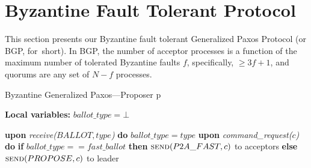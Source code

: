 \documentclass[algorithms,article,accept,moreauthors,pdftex,10pt,a4paper]{Definitions/mdpi}
\begin{document}
%

\section{Byzantine Fault Tolerant Protocol}
\label{sec:bft}
%
This section presents our Byzantine fault tolerant Generalized Paxos
Protocol (or BGP, for~short). 
In BGP, the number of acceptor processes is a function of the maximum number of tolerated Byzantine faults $f$, specifically, $\geq 3f+1$, and quorums are any set of $N-f$ processes.

\begin{algorithm}[H]
\caption{Byzantine Generalized Paxos---Proposer p}
\label{BFT-Prop}
\textbf{Local variables:} $ballot\_type = \bot$
\begin{algorithmic}[1] 
\State \textbf{upon} \textit{receive($BALLOT, type$)} \textbf{do} 
\State \hspace{\algorithmicindent} $ballot\_type = type$
\State
\State \textbf{upon} \textit{command\_request($c$)} \textbf{do} \hspace{\algorithmicindent}\hspace{\algorithmicindent}\hspace{\algorithmicindent}\hspace{\algorithmicindent}
\State \hspace{\algorithmicindent} \textbf{if} $ballot\_type == fast\_ballot$ \textbf{then}
\State \hspace{\algorithmicindent}\hspace{\algorithmicindent} $\Call{send}{P2A\_FAST, c}$ to acceptors
\State \hspace{\algorithmicindent} \textbf{else} 
\State \hspace{\algorithmicindent}\hspace{\algorithmicindent} $\Call{send}{PROPOSE, c}$ to leader
\end{algorithmic}
\end{algorithm}
\end{document}
